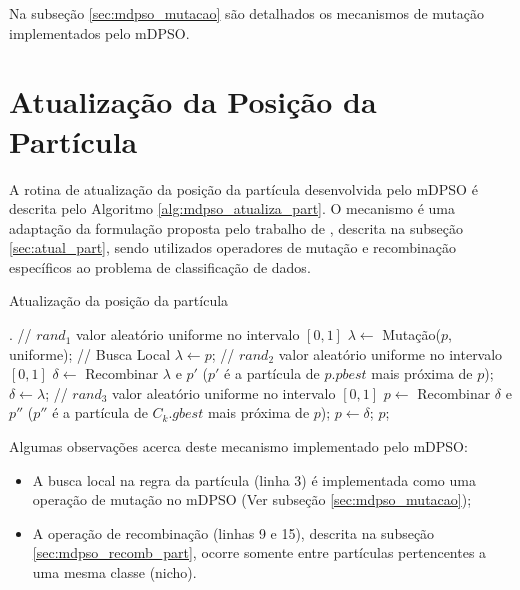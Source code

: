 \documentclass[
	12pt,				%
	openany,			%
	oneside,	
	a4paper,			%
	brazil,				%
	]{unimontes-ppgmsc-abntex2}
\begin{document}
Na subseção \ref{sec:mdpso_mutacao} são detalhados os mecanismos de mutação implementados pelo mDPSO.

\section{Atualização da Posição da Partícula}
\label{sec:mdpso_atual_pos_part}

A rotina de atualização da posição da partícula desenvolvida pelo mDPSO é descrita pelo Algoritmo \ref{alg:mdpso_atualiza_part}. O mecanismo é uma adaptação da formulação proposta pelo trabalho de , descrita na subseção \ref{sec:atual_part}, sendo utilizados operadores de mutação e recombinação específicos ao problema de classificação de dados. 

\begin{algorithm}[ht]
\caption{Atualização da posição da partícula}
\label{alg:mdpso_atualiza_part}
\begin{algorithmic}[1]
.
\State // $rand_1$ valor aleatório uniforme no intervalo $[0, 1]$
	\State $\lambda \leftarrow $ Mutação($p$, uniforme); // Busca Local 
\Else
	\State $\lambda \leftarrow p$;
\EndIf
\State // $rand_2$ valor aleatório uniforme no intervalo $[0, 1]$
	\State $\delta \leftarrow $ Recombinar $\lambda$ e $p'$ ($p'$ é a partícula de $p.pbest$ mais próxima de $p$);
\Else
	\State $\delta \leftarrow \lambda$;
\EndIf
\State // $rand_3$ valor aleatório uniforme no intervalo $[0, 1]$
	\State $p \leftarrow $ Recombinar $\delta$ e $p''$ ($p''$ é a partícula de $C_k.gbest$ mais próxima de $p$);
\Else
	\State $p \leftarrow \delta$;
\EndIf
\State \Return $p$;
\end{algorithmic}
\end{algorithm}

Algumas observações acerca deste mecanismo implementado pelo mDPSO:

\begin{itemize}
\item A busca local na regra da partícula (linha 3) é implementada como uma operação de mutação no mDPSO (Ver subseção \ref{sec:mdpso_mutacao});
\item A operação de recombinação (linhas 9 e 15), descrita na subseção \ref{sec:mdpso_recomb_part}, ocorre somente entre partículas pertencentes a uma mesma classe (nicho).
\end{itemize}
\end{document}
